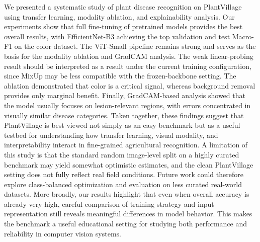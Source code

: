\documentclass[10pt,twocolumn,letterpaper]{article}
\begin{document}
We presented a systematic study of plant disease recognition on PlantVillage using transfer learning, modality ablation, and explainability analysis. Our experiments show that full fine-tuning of pretrained models provides the best overall results, with EfficientNet-B3 achieving the top validation and test Macro-F1 on the color dataset. The ViT-Small pipeline remains strong and serves as the basis for the modality ablation and GradCAM analysis. The weak linear-probing result should be interpreted as a result under the current training configuration, since MixUp may be less compatible with the frozen-backbone setting. The ablation demonstrated that color is a critical signal, whereas background removal provides only marginal benefit. Finally, GradCAM-based analysis showed that the model usually focuses on lesion-relevant regions, with errors concentrated in visually similar disease categories. Taken together, these findings suggest that PlantVillage is best viewed not simply as an easy benchmark but as a useful testbed for understanding how transfer learning, visual modality, and interpretability interact in fine-grained agricultural recognition. A limitation of this study is that the standard random image-level split on a highly curated benchmark may yield somewhat optimistic estimates, and the clean PlantVillage setting does not fully reflect real field conditions. Future work could therefore explore class-balanced optimization and evaluation on less curated real-world datasets. More broadly, our results highlight that even when overall accuracy is already very high, careful comparison of training strategy and input representation still reveals meaningful differences in model behavior. This makes the benchmark a useful educational setting for studying both performance and reliability in computer vision systems.

\vspace{-2mm}
{\small


}
\end{document}
